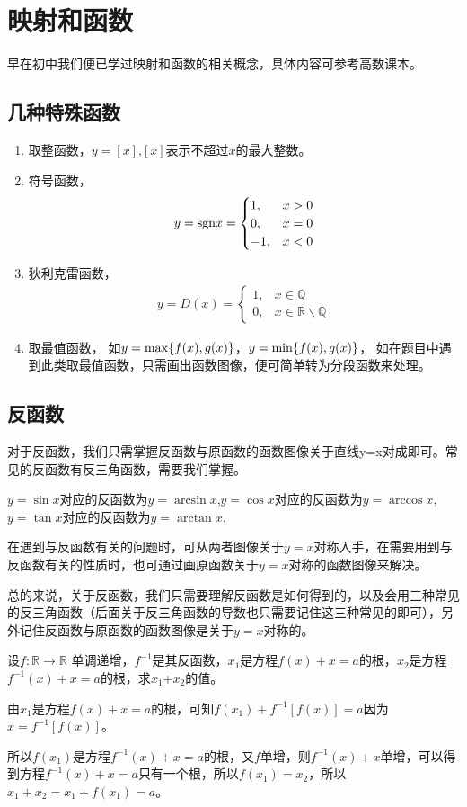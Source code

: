 \section{映射和函数}
早在初中我们便已学过映射和函数的相关概念，具体内容可参考高数课本。
\subsection{几种特殊函数}
\begin{enumerate}
	\item 取整函数，$y=[x]$,$[x]$表示不超过$x$的最大整数。
	\item 符号函数，
	\begin{eqnarray}
		y={\rm sgn} x=
		\begin{cases}
			1,  & x>0 \\
			0,  & x=0 \\
			-1, & x<0
		\end{cases}
	\end{eqnarray}
	\item 狄利克雷函数，
	\begin{eqnarray}
		y=D(x)=
		\begin{cases}
			1, & x\in \mathbb{Q} \\
			0, & x\in \mathbb{R} \backslash \mathbb{Q}
		\end{cases}
	\end{eqnarray}
	\item 取最值函数，
	如$y={\rm max}\{f(x),g(x)\}$，$y={\rm min}\{f(x),g(x)\}$，
	如在题目中遇到此类取最值函数，只需画出函数图像，便可简单转为分段函数来处理。
\end{enumerate}

\subsection{反函数}

对于反函数，我们只需掌握反函数与原函数的函数图像关于直线y=x对成即可。常见的反函数有反三角函数，需要我们掌握。

$y=\sin x$对应的反函数为$y=\arcsin x$,$y=\cos x $对应的反函数为$y=\arccos x$,$y=\tan x $对应的反函数为$y=\arctan x$.

在遇到与反函数有关的问题时，可从两者图像关于$y=x$对称入手，在需要用到与反函数有关的性质时，也可通过画原函数关于$y=x$对称的函数图像来解决。

总的来说，关于反函数，我们只需要理解反函数是如何得到的，以及会用三种常见的反三角函数（后面关于反三角函数的导数也只需要记住这三种常见的即可），另外记住反函数与原函数的函数图像是关于$y=x$对称的。
\begin{example}
	设$f: \mathbb{R} \to \mathbb{R}$ 单调递增，$f^{-1}$是其反函数，$x_1$是方程$f(x)+x=a$的根，$x_2$是方程$f^{-1}(x)+x=a$的根，求$x_1$+$x_2$的值。
	\begin{solution}
		由$x_1$是方程$f(x)+x=a$的根，可知$f(x_1)+f^{-1}[f(x)]=a$因为$x=f^{-1}[f(x)]$。
		
		所以$f(x_1)$是方程$f^{-1}(x)+x=a$的根，又$f$单增，则$f^{-1}(x)+x$单增，可以得到方程$f^{-1}(x)+x=a$只有一个根，所以$f(x_1)=x_2$，所以$x_1+x_2=x_1+f(x_1)=a$。
	\end{solution}
\end{example}

